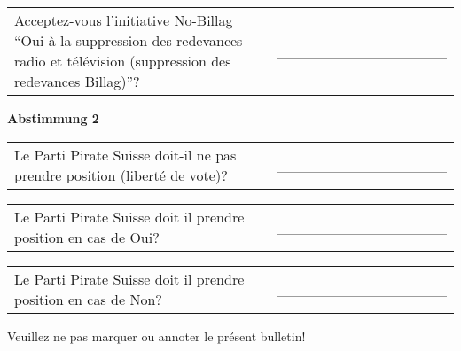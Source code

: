 \documentclass[11pt, a4paper]{scrartcl}
\begin{document}
{\begin{minipage}[t][12.5cm][t]{17.7cm}
\begin{tabular}{ b{13.5cm} b{3cm} }
Acceptez-vous l'initiative No-Billag \enquote{Oui à la suppression des redevances radio et télévision (suppression des redevances Billag)}?
& \_\_\_\_\_\_\_\_\_\_\_\_\_\_\_\_ \\
\end{tabular}

\vspace{0.5cm}

\textbf{Abstimmung 2}

\vspace{0.5cm}

\begin{tabular}{ b{13.5cm} b{3cm} }
Le Parti Pirate Suisse doit-il ne pas prendre position (liberté de vote)?
& \_\_\_\_\_\_\_\_\_\_\_\_\_\_\_\_ \\
\end{tabular}

\vspace{0.5cm}

\begin{tabular}{ b{13.5cm} b{3cm} }
Le Parti Pirate Suisse doit il prendre position en cas de Oui?
& \_\_\_\_\_\_\_\_\_\_\_\_\_\_\_\_ \\
\end{tabular}

\vspace{0.5cm}

\begin{tabular}{ b{13.5cm} b{3cm} }
Le Parti Pirate Suisse doit il prendre position en cas de Non?
& \_\_\_\_\_\_\_\_\_\_\_\_\_\_\_\_ \\
\end{tabular}

\vspace{0.5cm}

Veuillez ne pas marquer ou annoter le présent bulletin!


\end{minipage}


}
\end{document}
